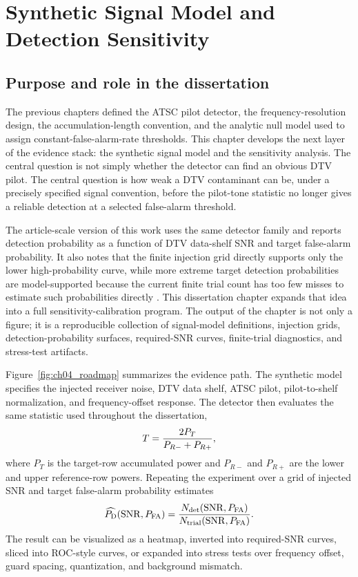 \chapter{Synthetic Signal Model and Detection Sensitivity}

\section{Purpose and role in the dissertation}

The previous chapters defined the ATSC pilot detector, the frequency-resolution design, the accumulation-length convention, and the analytic null model used to assign constant-false-alarm-rate thresholds.  This chapter develops the next layer of the evidence stack: the synthetic signal model and the sensitivity analysis.  The central question is not simply whether the detector can find an obvious DTV pilot.  The central question is how weak a DTV contaminant can be, under a precisely specified signal convention, before the pilot-tone statistic no longer gives a reliable detection at a selected false-alarm threshold.

The article-scale version of this work uses the same detector family and reports detection probability as a function of DTV data-shelf SNR and target false-alarm probability.  It also notes that the finite injection grid directly supports only the lower high-probability curve, while more extreme target detection probabilities are model-supported because the current finite trial count has too few misses to estimate such probabilities directly \cite{gormley2026draft}.  This dissertation chapter expands that idea into a full sensitivity-calibration program.  The output of the chapter is not only a figure; it is a reproducible collection of signal-model definitions, injection grids, detection-probability surfaces, required-SNR curves, finite-trial diagnostics, and stress-test artifacts.

Figure~\ref{fig:ch04_roadmap} summarizes the evidence path.  The synthetic model specifies the injected receiver noise, DTV data shelf, ATSC pilot, pilot-to-shelf normalization, and frequency-offset response.  The detector then evaluates the same statistic used throughout the dissertation,
\begin{equation}
  T=\frac{2P_T}{P_{R-}+P_{R+}},
  \label{eq:ch04_statistic}
\end{equation}
where $P_T$ is the target-row accumulated power and $P_{R-}$ and $P_{R+}$ are the lower and upper reference-row powers.  Repeating the experiment over a grid of injected SNR and target false-alarm probability estimates
\begin{equation}
  \widehat{P_{\rm D}}(\mathrm{SNR},P_{\rm FA})=\frac{N_{\rm det}(\mathrm{SNR},P_{\rm FA})}{N_{\rm trial}(\mathrm{SNR},P_{\rm FA})}.
\end{equation}
The result can be visualized as a heatmap, inverted into required-SNR curves, sliced into ROC-style curves, or expanded into stress tests over frequency offset, guard spacing, quantization, and background mismatch.

